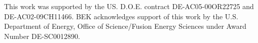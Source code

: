 \documentclass[%
 aip,
 amsmath,amssymb,
 reprint,%
]{revtex4-1}
\begin{document}
\begin{acknowledgments}
This work was supported by the US. D.O.E. contract DE-AC05-00OR22725 and DE-AC02-09CH11466. BEK acknowledges support of this work by the U.S. Department of Energy, Office of Science/Fusion Energy Sciences under Award Number DE-SC0012890.

\end{acknowledgments}

\nocite{*}
\end{document}
